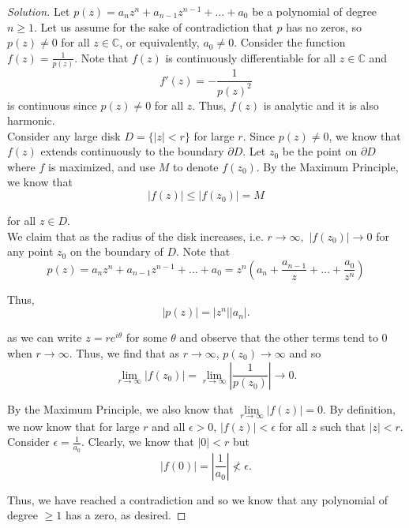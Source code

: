\documentclass[11pt]{article}
\newcommand{\C}{\mathbb{C}}
\newenvironment{solution}
  {\renewcommand\qedsymbol{$\blacksquare$}\begin{proof}[Solution]}
  {\end{proof}}
\theoremstyle{definition}
\begin{document}
\begin{solution}
Let $p(z) = a_nz^n + a_{n-1}z^{n-1} + \dots + a_0$ be a polynomial of degree $n \geq 1$. Let us assume for the sake of contradiction that $p$ has no zeros, so $p(z) \neq 0$ for all $z \in \mathbb{C}$, or equivalently, $a_0 \neq 0$. Consider the function $f(z) = \frac{1}{p(z)}.$ Note that $f(z)$ is continuously differentiable for all $z\in \C$ and 
\[f'(z) = -\frac{1}{p(z)^2}\] is continuous since $p(z) \neq 0$ for all $z$. Thus, $f(z)$ is analytic and it is also harmonic. \\

Consider any large disk $D = \{|z| < r\}$ for large $r$. Since $p(z) \neq 0$, we know that $f(z)$ extends continuously to the boundary $\partial D$. 
Let $z_0$ be the point on $\partial D$ where $f$ is maximized, and use $M$ to denote $f(z_0)$. By the Maximum Principle, we know that
\[ |f(z)| \leq |f(z_0)| = M \]

for all $z \in D$. \\

We claim that as the radius of the disk increases, i.e. $r \rightarrow \infty,$ $|f(z_0)| \rightarrow 0$ for any point $z_0$ on the boundary of $D$. Note that \[ p(z) = a_nz^n + a_{n-1}z^{n-1} + \dots + a_0 = z^n\left(a_n + \frac{a_{n-1}}{z} + \dots + \frac{a_0}{z^n}\right)\]

Thus, \[ |p(z)| = |z^n||a_n|. \]

as we can write $z = re^{i\theta}$ for some $\theta$ and observe that the other terms tend to $0$ when $r \rightarrow \infty$. Thus, we find that as $r \rightarrow \infty$, $p(z_0) \rightarrow \infty$ and so 
\[\lim\limits_{r \rightarrow \infty}|f(z_0)| = \lim\limits_{r \rightarrow \infty} \left|\frac{1}{p(z_0)}\right| \rightarrow 0.\] 

By the Maximum Principle, we also know that $\lim \limits_{r \rightarrow \infty} |f(z)| = 0$. By definition, we now know that for large $r$ and all $\epsilon > 0$, $|f(z)| < \epsilon$ for all $z$ such that $|z| < r.$ \\

Consider $\epsilon = \frac{1}{a_0}.$ Clearly, we know that $|0| < r$ but \[|f(0)| = \left|\frac{1}{a_0}\right| \nless \epsilon.\]

Thus, we have reached a contradiction and so we know that any polynomial of degree $\geq 1$ has a zero, as desired.
\end{solution}
\end{document}
